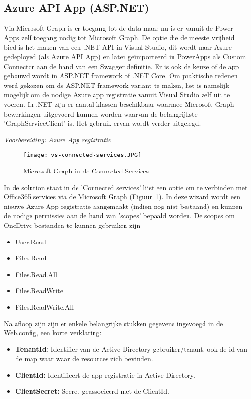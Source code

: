 \subsection{Azure API App (ASP.NET)}

Via Microsoft Graph is er toegang tot de data maar nu is er vanuit de Power Apps zelf toegang nodig tot Microsoft Graph. De optie die de meeste vrijheid bied is het maken van een .NET API in Visual Studio, dit wordt naar Azure gedeployed (als Azure API App) en later geïmporteerd in PowerApps als Custom Connector aan de hand van een Swagger definitie. Er is ook de keuze of de app gebouwd wordt in ASP.NET framework of .NET Core. Om praktische redenen werd gekozen om de ASP.NET framework variant te maken, het is namelijk mogelijk om de nodige Azure app registratie vanuit Visual Studio zelf uit te voeren.
In .NET zijn er aantal klassen beschikbaar waarmee Microsoft Graph bewerkingen uitgevoerd kunnen worden waarvan de belangrijkste 'GraphServiceClient' is. Het gebruik ervan wordt verder uitgelegd.

\textit{Voorbereiding: Azure App registratie}

\begin{figure}[h!]
    \texttt{[image: vs-connected-services.JPG]}
    \caption{Microsoft Graph in de Connected Services}
    \label{fig:vs-connected-services}
\end{figure}

In de solution staat in de 'Connected services' lijst een optie om te verbinden met Office365 services via de Microsoft Graph (Figuur~\ref{fig:vs-connected-services}). In deze wizard wordt een nieuwe Azure App registratie aangemaakt (indien nog niet bestaand) en kunnen de nodige permissies aan de hand van 'scopes' bepaald worden. De scopes om OneDrive bestanden te kunnen gebruiken zijn:
\begin{itemize}
    \item User.Read 
    \item Files.Read 
    \item Files.Read.All 
    \item Files.ReadWrite 
    \item Files.ReadWrite.All
\end{itemize}

Na afloop zijn zijn er enkele belangrijke stukken gegevens ingevoegd in de Web.config, een korte verklaring:
\begin{itemize}
    \item \textbf{TenantId:} Identifier van de Active Directory gebruiker/tenant, ook de id van de map waar waar de resources zich bevinden.
    \item \textbf{ClientId:} Identifieert de app registratie in Active Directory.
    \item \textbf{ClientSecret:} Secret geassocieerd met de ClientId.
\end{itemize}

